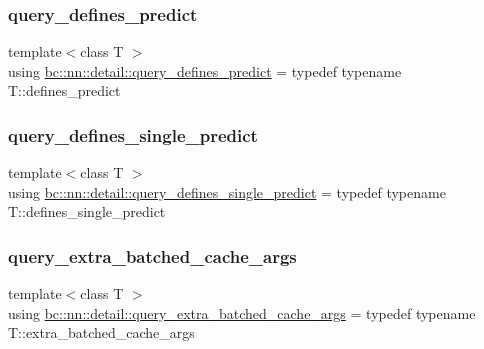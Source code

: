 \mbox{\label{namespacebc_1_1nn_1_1detail_ad39fb4d3bf636fece8bd359a3bca9579}} 
\subsubsection{\texorpdfstring{query\+\_\+defines\+\_\+predict}{query\_defines\_predict}}
{\footnotesize\ttfamily template$<$class T $>$ \\
using \hyperlink{namespacebc_1_1nn_1_1detail_ad39fb4d3bf636fece8bd359a3bca9579}{bc\+::nn\+::detail\+::query\+\_\+defines\+\_\+predict} = typedef typename T\+::defines\+\_\+predict}

\mbox{\label{namespacebc_1_1nn_1_1detail_aa141b344c5a584e16057d62b8b9cba6f}} 
\subsubsection{\texorpdfstring{query\+\_\+defines\+\_\+single\+\_\+predict}{query\_defines\_single\_predict}}
{\footnotesize\ttfamily template$<$class T $>$ \\
using \hyperlink{namespacebc_1_1nn_1_1detail_aa141b344c5a584e16057d62b8b9cba6f}{bc\+::nn\+::detail\+::query\+\_\+defines\+\_\+single\+\_\+predict} = typedef typename T\+::defines\+\_\+single\+\_\+predict}

\mbox{\label{namespacebc_1_1nn_1_1detail_a0e5abd56399f408e7b9dc5bf91d70f6e}} 
\subsubsection{\texorpdfstring{query\+\_\+extra\+\_\+batched\+\_\+cache\+\_\+args}{query\_extra\_batched\_cache\_args}}
{\footnotesize\ttfamily template$<$class T $>$ \\
using \hyperlink{namespacebc_1_1nn_1_1detail_a0e5abd56399f408e7b9dc5bf91d70f6e}{bc\+::nn\+::detail\+::query\+\_\+extra\+\_\+batched\+\_\+cache\+\_\+args} = typedef typename T\+::extra\+\_\+batched\+\_\+cache\+\_\+args}

